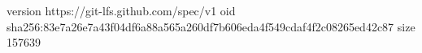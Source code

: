version https://git-lfs.github.com/spec/v1
oid sha256:83e7a26e7a43f04df6a88a565a260df7b606eda4f549cdaf4f2c08265ed42c87
size 157639
